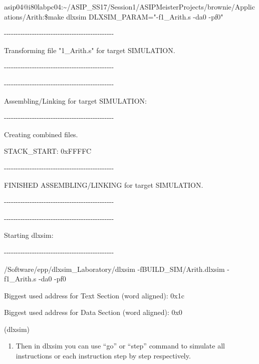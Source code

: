 \documentclass[
]{article}
\begin{document}
asip04@i80labpc04:\textasciitilde/ASIP\_SS17/Session1/ASIPMeisterProjects/brownie/Applications/Arith:\$make
dlxsim DLXSIM\_PARAM="-f1\_Arith.s -da0 -pf0"

-\/-\/-\/-\/-\/-\/-\/-\/-\/-\/-\/-\/-\/-\/-\/-\/-\/-\/-\/-\/-\/-\/-\/-\/-\/-\/-\/-\/-\/-\/-\/-\/-\/-\/-\/-\/-\/-\/-\/-\/-\/-\/-\/-\/-\/-\/-

Transforming file "1\_Arith.s" for target SIMULATION.

-\/-\/-\/-\/-\/-\/-\/-\/-\/-\/-\/-\/-\/-\/-\/-\/-\/-\/-\/-\/-\/-\/-\/-\/-\/-\/-\/-\/-\/-\/-\/-\/-\/-\/-\/-\/-\/-\/-\/-\/-\/-\/-\/-\/-\/-\/-

-\/-\/-\/-\/-\/-\/-\/-\/-\/-\/-\/-\/-\/-\/-\/-\/-\/-\/-\/-\/-\/-\/-\/-\/-\/-\/-\/-\/-\/-\/-\/-\/-\/-\/-\/-\/-\/-\/-\/-\/-\/-\/-\/-\/-\/-\/-

Assembling/Linking for target SIMULATION:

-\/-\/-\/-\/-\/-\/-\/-\/-\/-\/-\/-\/-\/-\/-\/-\/-\/-\/-\/-\/-\/-\/-\/-\/-\/-\/-\/-\/-\/-\/-\/-\/-\/-\/-\/-\/-\/-\/-\/-\/-\/-\/-\/-\/-\/-\/-

Creating combined files.

STACK\_START: 0xFFFFC

-\/-\/-\/-\/-\/-\/-\/-\/-\/-\/-\/-\/-\/-\/-\/-\/-\/-\/-\/-\/-\/-\/-\/-\/-\/-\/-\/-\/-\/-\/-\/-\/-\/-\/-\/-\/-\/-\/-\/-\/-\/-\/-\/-\/-\/-\/-

FINISHED ASSEMBLING/LINKING for target SIMULATION.

-\/-\/-\/-\/-\/-\/-\/-\/-\/-\/-\/-\/-\/-\/-\/-\/-\/-\/-\/-\/-\/-\/-\/-\/-\/-\/-\/-\/-\/-\/-\/-\/-\/-\/-\/-\/-\/-\/-\/-\/-\/-\/-\/-\/-\/-\/-

-\/-\/-\/-\/-\/-\/-\/-\/-\/-\/-\/-\/-\/-\/-\/-\/-\/-\/-\/-\/-\/-\/-\/-\/-\/-\/-\/-\/-\/-\/-\/-\/-\/-\/-\/-\/-\/-\/-\/-\/-\/-\/-\/-\/-\/-\/-

Starting dlxsim:

-\/-\/-\/-\/-\/-\/-\/-\/-\/-\/-\/-\/-\/-\/-\/-\/-\/-\/-\/-\/-\/-\/-\/-\/-\/-\/-\/-\/-\/-\/-\/-\/-\/-\/-\/-\/-\/-\/-\/-\/-\/-\/-\/-\/-\/-\/-

/Software/epp/dlxsim\_Laboratory/dlxsim -fBUILD\_SIM/Arith.dlxsim
-f1\_Arith.s -da0 -pf0

Biggest used address for Text Section (word aligned): 0x1c

Biggest used address for Data Section (word aligned): 0x0

(dlxsim)

\begin{enumerate}
\def\labelenumi{\arabic{enumi}.}
\setcounter{enumi}{5}
\item
  Then in dlxsim you can use ``go'' or ``step'' command to simulate all
  instructions or each instruction step by step respectively.
\end{enumerate}
\end{document}
